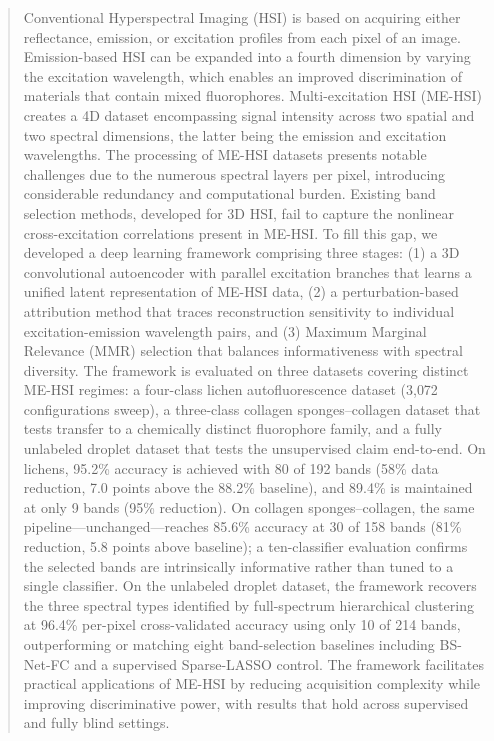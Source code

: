 \begin{abstract}
Conventional Hyperspectral Imaging (HSI) is based on acquiring either reflectance, emission, or excitation profiles from each pixel of an image.
Emission-based HSI can be expanded into a fourth dimension by varying the excitation wavelength, which enables an improved discrimination of materials that contain mixed fluorophores.
Multi-excitation HSI (ME-HSI) creates a 4D dataset encompassing signal intensity across two spatial and two spectral dimensions, the latter being the emission and excitation wavelengths.
The processing of ME-HSI datasets presents notable challenges due to the numerous spectral layers per pixel, introducing considerable redundancy and computational burden.
Existing band selection methods, developed for 3D HSI, fail to capture the nonlinear cross-excitation correlations present in ME-HSI.
To fill this gap, we developed a deep learning framework comprising three stages: (1) a 3D convolutional autoencoder with parallel excitation branches that learns a unified latent representation of ME-HSI data, (2) a perturbation-based attribution method that traces reconstruction sensitivity to individual excitation-emission wavelength pairs, and (3) Maximum Marginal Relevance (MMR) selection that balances informativeness with spectral diversity.
The framework is evaluated on three datasets covering distinct ME-HSI regimes: a four-class lichen autofluorescence dataset (3{,}072 configurations sweep), a three-class collagen sponges--collagen dataset that tests transfer to a chemically distinct fluorophore family, and a fully unlabeled droplet dataset that tests the unsupervised claim end-to-end.
On lichens, 95.2\% accuracy is achieved with 80 of 192 bands (58\% data reduction, 7.0 points above the 88.2\% baseline), and 89.4\% is maintained at only 9 bands (95\% reduction).
On collagen sponges--collagen, the same pipeline---unchanged---reaches 85.6\% accuracy at 30 of 158 bands (81\% reduction, 5.8 points above baseline); a ten-classifier evaluation confirms the selected bands are intrinsically informative rather than tuned to a single classifier.
On the unlabeled droplet dataset, the framework recovers the three spectral types identified by full-spectrum hierarchical clustering at 96.4\% per-pixel cross-validated accuracy using only 10 of 214 bands, outperforming or matching eight band-selection baselines including BS-Net-FC and a supervised Sparse-LASSO control.
The framework facilitates practical applications of ME-HSI by reducing acquisition complexity while improving discriminative power, with results that hold across supervised and fully blind settings.
\end{abstract}